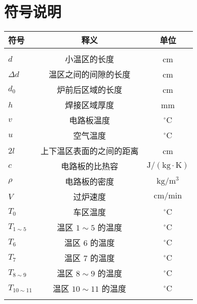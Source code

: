 \section{符号说明}
\begin{table}[H]
\centering
\begin{tabular}{lcc}\hline
符号				&释义					&单位\\ \hline
\\[-1em]
\(d\)				&小温区的长度 & cm\\
\(\varDelta d\)&温区之间的间隙的长度 & cm \\
\(d_{0}\)		&炉前后区域的长度 & cm\\
\(h\)				&焊接区域厚度 & mm\\
\(v\)				&电路板温度 & \({}^{\circ}\mathrm{C}\)\\
\(u\)				&空气温度 &\({}^{\circ}\mathrm{C}\)\\
\(2l\)			&上下温区表面的之间的距离 & cm\\
\(c\)				&电路板的比热容 & \(\mathrm{J}/(\mathrm{kg}\cdot \mathrm{K})\)\\
\(\rho\)		&电路板的密度 & \(\mathrm{kg}/\mathrm{m}^{3}\)\\
\(V\)				&过炉速度 & \(\mathrm{cm}/\mathrm{min}\)\\
\(T_{0}\)		&车区温度 & \({}^{\circ}\mathrm{C}\)\\
\(T_{1\sim 5}\)&温区 \(1 \sim 5\) 的温度 & \({}^{\circ}\mathrm{C}\)\\
\(T_{6}\)		&温区 \(6\) 的温度 & \({}^{\circ}\mathrm{C}\)\\
\(T_{7}\)		&温区 \(7\) 的温度 & \({}^{\circ}\mathrm{C}\)\\
\(T_{8\sim 9}\)&温区 \(8 \sim 9\) 的温度 & \({}^{\circ}\mathrm{C}\)\\
\(T_{10\sim 11}\)&温区 \(10 \sim 11\) 的温度 & \({}^{\circ}\mathrm{C}\)\\[-1em]
\\ \hline
\end{tabular}
\end{table}
